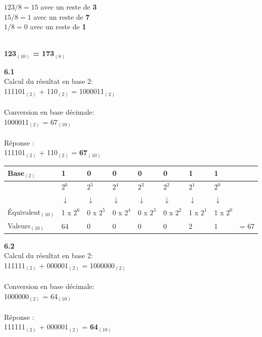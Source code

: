 \begin{Exercice}[20 minutes]
\begin{conseil}
        $123 / 8 = 15$ avec un reste de \textbf{3}\\
        $15 / 8 = 1$ avec un reste de \textbf{7}\\
        $1 / 8 = 0$ avec un reste de \textbf{1}\\\
        
        \textbf{123$_{(10)}$ = 173$_{(8)}$}\\
        
    \end{conseil}
    \begin{solution} \textbf{6.1}\\
        Calcul du résultat en base 2:\\
        111101$_{(2)}$ + 110$_{(2)}$ = 1000011$_{(2)}$\\\\
        Conversion en base décimale:\\
        1000011$_{(2)}$ = 67$_{(10)}$\\\\
        Réponse :\\
        111101$_{(2)}$ + 110$_{(2)}$ = \textbf{67$_{(10)}$}\\
        
        \begin{tabular}{| C{0.15\textwidth} | C{0.07\textwidth} | C{0.07\textwidth} | C{0.07\textwidth} | C{0.07\textwidth} | C{0.07\textwidth} | C{0.07\textwidth} | C{0.07\textwidth} | C{0.06\textwidth} |} 
            \hline
            Base$_{(2)}$ & \textbf{1} & \textbf{0} & \textbf{0} & \textbf{0} & \textbf{0} & \textbf{1} & \textbf{1} & \textbf{}\\ [0.5ex]
            \hline
             & $2^6$ & $2^5$ & $2^4$ & $2^3$ & $2^2$ & $2^1$ & $2^0$ & \\ [0.5ex] 
            \hline
             & $\downarrow$ & $\downarrow$ & $\downarrow$ & $\downarrow$ & $\downarrow$ & $\downarrow$ & $\downarrow$ & \\ [0.5ex] 
            \hline
            Équivalent$_{(10)}$ & 1 x $2^6$ & 0 x $2^5$ & 0 x $2^4$ & 0 x $2^3$ & 0 x $2^2$ & 1 x $2^1$ & 1 x $2^0$ & \\ [0.5ex]     
            \hline
            Valeurs$_{(10)}$ & 64 & 0 & 0 & 0 & 0 & 2 & 1 & = 67 \\ [0.5ex]
            \hline
        \end{tabular}
        
    \end{solution}
    \begin{solution} \textbf{6.2}\\
        Calcul du résultat en base 2:\\
        111111$_{(2)}$ + 000001$_{(2)}$ = 1000000$_{(2)}$\\\\
        Conversion en base décimale:\\
        1000000$_{(2)}$ = 64$_{(10)}$\\\\
        Réponse :\\
        111111$_{(2)}$ + 000001$_{(2)}$ = \textbf{64$_{(10)}$}\\
    

\end{solution}
\end{Exercice}
